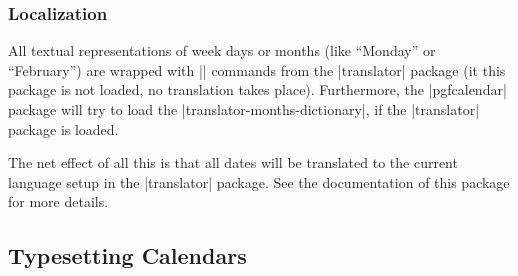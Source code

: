 \subsubsection{Localization}

\label{section-calendar-locale}
All textual representations of week days or months (like ``Monday'' or
``February'') are wrapped with |\translate| commands from the
|translator| package (it this package is not loaded, no translation
takes place). Furthermore, the |pgfcalendar| package will try to load
the |translator-months-dictionary|, if the |translator| package is
loaded.

The net effect of all this is that all dates will be translated to the
current language setup in the |translator| package. See the
documentation of this package for more details.



\subsection{Typesetting Calendars}


